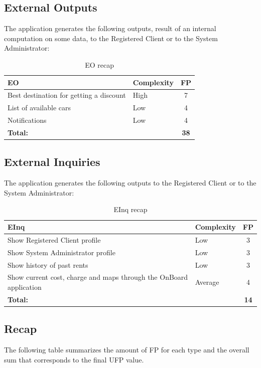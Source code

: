 \subsection{External Outputs}
The application generates the following outputs, result of an internal computation on some data, to the Registered Client or to the System Administrator:

\begin{table}[!h]
\centering
\caption{EO recap}
\label{eo-recap}
\begin{tabularx}{\linewidth}{XXc}
\hline
\textbf{EO}                                      & \textbf{Complexity} & \textbf{FP}     \\ \hline
Best destination for getting a discount & High       & 7 \\
List of available cars                  & Low        & 4 \\
Notifications                           & Low        & 4 \\ \hline
\textbf{Total:}                         &            & \textbf{38}
\end{tabularx}
\end{table}

\subsection{External Inquiries}
The application generates the following outputs to the Registered Client or to the System Administrator:

\begin{table}[!h]
\centering
\caption{EInq recap}
\label{einq-recap}
\begin{tabularx}{\linewidth}{XXc}
\hline
\textbf{EInq}                                    & \textbf{Complexity} & \textbf{FP} \\ \hline
Show Registered Client profile          & Low        & 3 \\
Show System Administrator profile       & Low        & 3 \\
Show history of past rents              & Low        & 3 \\
Show current cost, charge and maps through the OnBoard application & Average & 4 \\ \hline
\textbf{Total:}                         &            & \textbf{14}
\end{tabularx}
\end{table}

\subsection{Recap}
The following table summarizes the amount of FP for each type and the overall sum that corresponds to the final UFP value.

